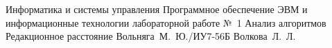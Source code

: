 \documentclass{bmstu}
\begin{document}
\makereporttitle
	{Информатика и системы управления} %
	{Программное обеспечение ЭВМ и информационные технологии} %
	{лабораторной работе №~1} %
	{Анализ алгоритмов} %
	{Редакционное расстояние} %
	{} %
	{Вольняга~М.~Ю./ИУ7-56Б} %
	{Волкова~Л.~Л.} %

\maketableofcontents








\makebibliography
\end{document}
